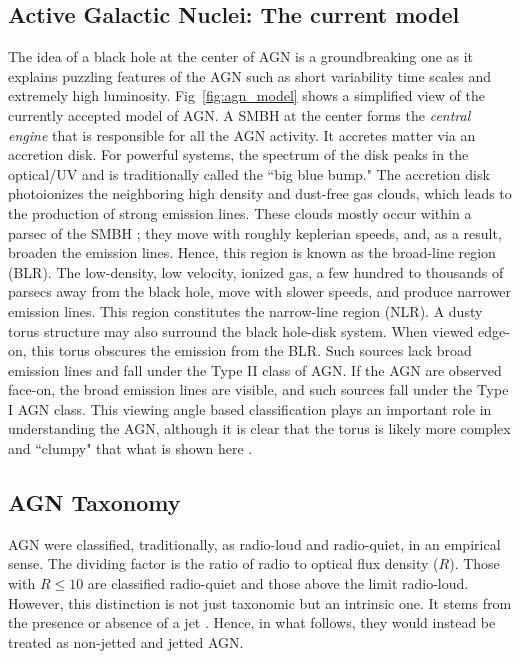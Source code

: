 \subsection{Active Galactic Nuclei: The current model \label{sec:agn_current_model}}
\begin{figure*}
    \caption{A simplified schema of the current model of the AGN, not drawn to scale. The taxonomy of the AGN is a result of the presence or absence of various components and observational effects. Figure adapted from \citet{beckmann2012agn}.    \label{fig:agn_model} }
\end{figure*}
The idea of a black hole at the center of AGN is a groundbreaking one as it explains puzzling  features of the AGN such as short variability time scales and extremely high luminosity. Fig~\ref{fig:agn_model} shows a simplified view of the currently accepted model of AGN.  A SMBH at the center forms the \textit{central engine} that is responsible for all the AGN activity. It accretes matter via an accretion disk. For powerful systems, the spectrum of the disk peaks in the optical/UV and is traditionally called the ``big blue bump." The accretion disk photoionizes the neighboring high density and dust-free gas clouds, which leads to the production of strong  emission lines. These clouds mostly occur within a parsec of the SMBH \citep{peterson2006broad}; they move with roughly keplerian speeds, and, as a result,  broaden the emission lines. Hence, this region is known as the broad-line region (BLR). The low-density, low velocity, ionized gas, a few hundred to thousands of parsecs away from the black hole, move with slower speeds, and produce narrower emission lines. This region constitutes the narrow-line region (NLR). A dusty torus structure may also surround the black hole-disk system. When viewed edge-on, this torus obscures the emission from the BLR. Such sources lack broad emission lines and fall under the Type II class of AGN. If the AGN are observed face-on, the broad emission lines are visible, and such sources fall under the Type I AGN class. This viewing angle based classification plays an important role in understanding the AGN, although it is clear that the torus is likely more complex and ``clumpy" that what is shown here \citep[see][and references there in]{H_nig_2019}.
 \subsection{AGN Taxonomy \label{sec:taxonomy}}
AGN were classified, traditionally, as radio-loud and radio-quiet, in an empirical sense. The dividing factor is the ratio of radio to optical flux density ($R$). Those with $R\leq10$ are classified radio-quiet and those above the limit radio-loud. However, this distinction is not just taxonomic but an intrinsic one. It stems from the presence or absence of a jet \citep{Padovani_2017}. Hence, in what follows, they would instead be treated as non-jetted and jetted AGN.
